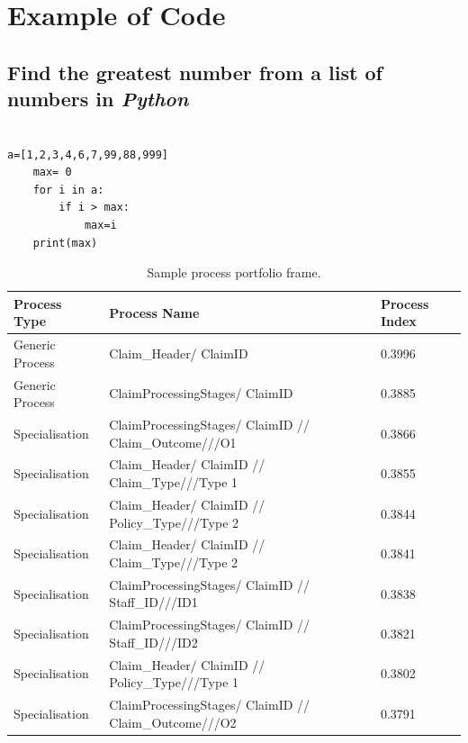 \chapter{Example of Code}

\section{Find the greatest number from a list of numbers in \textit{Python}}

\begin{verbatim}

a=[1,2,3,4,6,7,99,88,999]
    max= 0
    for i in a:
        if i > max:
            max=i
    print(max)

\end{verbatim}


   \begin{table}[H]
    \caption{Sample process portfolio frame.}
    \label{tab:PortfolioFrame}
        \setlength{\tabcolsep}{12pt}
        \centering
        \renewcommand{\arraystretch}{1.2}
        \small
        \resizebox{\textwidth}{!}
        {
        {\selectfont
    \begin{tabular}{lll} 
        \hline
        \textbf{Process Type} & \textbf{Process Name} & \textbf{Process Index}\\ 
        \hline
        Generic Process & Claim\_Header/ ClaimID & 0.3996\\
        \hline
        Generic Process & ClaimProcessingStages/ ClaimID & 0.3885\\
        \hline
        {Specialisation}
        & ClaimProcessingStages/ ClaimID // Claim\_Outcome///O1 & 0.3866\\
        \hline
        {Specialisation}
        & Claim\_Header/ ClaimID // Claim\_Type///Type 1& 0.3855\\
        \hline
        {Specialisation} 
        & Claim\_Header/ ClaimID // Policy\_Type///Type 2& 0.3844\\
        \hline
        {Specialisation}
        & Claim\_Header/ ClaimID // Claim\_Type///Type 2& 0.3841\\
        \hline
        {Specialisation} 
        & ClaimProcessingStages/ ClaimID // Staff\_ID///ID1 & 0.3838\\
        \hline
        {Specialisation} 
        & ClaimProcessingStages/ ClaimID // Staff\_ID///ID2 & 0.3821\\
        \hline
        {Specialisation} 
        & Claim\_Header/ ClaimID // Policy\_Type///Type 1& 0.3802\\
        \hline
        {Specialisation} 
        & ClaimProcessingStages/ ClaimID // Claim\_Outcome///O2& 0.3791\\
        \hline
    \end{tabular}
    }
    }
    \end{table}